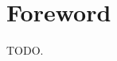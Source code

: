 \documentclass[../main.tex]{subfiles}
\begin{document}
\chapter*{Foreword}

TODO.\\\lipsum[4-5]
\end{document}
